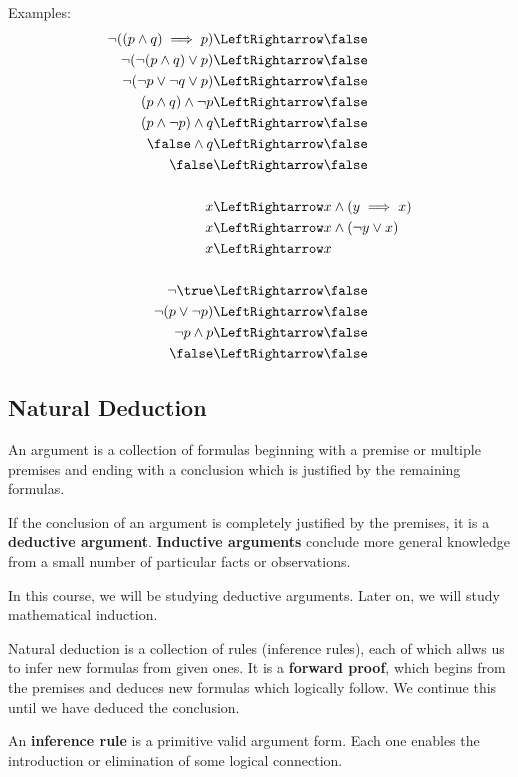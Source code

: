 \documentclass[12pt]{article}
\begin{document}
Examples:
\begin{align*}
\neg ( ( p \land q ) \implies p ) &\LeftRightarrow \false\\
\neg ( \neg ( p \land q ) \lor p ) &\LeftRightarrow \false\\
\neg ( \neg p \lor \neg q \lor p ) &\LeftRightarrow \false\\
(p \land q) \land \neg p &\LeftRightarrow \false\\
(p \land \neg p) \land q &\LeftRightarrow \false\\
\false \land q &\LeftRightarrow \false\\
\false &\LeftRightarrow \false\\\\
x &\LeftRightarrow x \land (y \implies x)\\
x &\LeftRightarrow x \land ( \neg y \lor x)\\
x &\LeftRightarrow x\\\\
\neg \true &\LeftRightarrow \false\\
\neg (p \lor \neg p) &\LeftRightarrow \false\\
\neg p \land p &\LeftRightarrow \false\\
\false &\LeftRightarrow \false\\
\end{align*}

\subsection*{Natural Deduction}
An argument is a collection of formulas beginning with a premise or multiple premises and ending with a conclusion which is justified by the remaining formulas.

If the conclusion of an argument is completely justified by the premises, it is a {\bf deductive argument}. {\bf Inductive arguments} conclude more general knowledge from a small number of particular facts or observations.

In this course, we will be studying deductive arguments. Later on, we will study mathematical induction.

Natural deduction is a collection of rules (inference rules), each of which allws us to infer new formulas from given ones. It is a {\bf forward proof}, which begins from the premises and deduces new formulas which logically follow. We continue this until we have deduced the conclusion.

An {\bf inference rule} is a primitive valid argument form. Each one enables the introduction or elimination of some logical connection.
\end{document}
